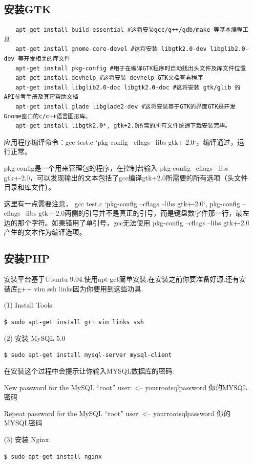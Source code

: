 \subsection{安装GTK}
\begin{verbatim}
　　apt-get install build-essential #这将安装gcc/g++/gdb/make 等基本编程工具
　　apt-get install gnome-core-devel #这将安装 libgtk2.0-dev libglib2.0-dev 等开发相关的库文件
　　apt-get install pkg-config #用于在编译GTK程序时自动找出头文件及库文件位置
　　apt-get install devhelp #这将安装 devhelp GTK文档查看程序
　　apt-get install libglib2.0-doc libgtk2.0-doc #这将安装 gtk/glib 的API参考手册及其它帮助文档
　　apt-get install glade libglade2-dev #这将安装基于GTK的界面GTK是开发Gnome窗口的c/c++语言图形库。
　　apt-get install libgtk2.0*, gtk+2.0所需的所有文件统通下载安装完毕。
\end{verbatim}

应用程序编译命令：gcc test.c `pkg-config --cflags --libs gtk+-2.0`，编译通过，运行正常。

pkg-config是一个用来管理包的程序，在控制台输入 pkg-config --cflags --libs gtk+-2.0，可以发现输出的文本包括了gcc编译gtk+2.0所需要的所有选项（头文件目录和库文件）。

这里有一点需要注意， gcc test.c `pkg-config --cflags --libs gtk+-2.0`, pkg-config --cflags --libs gtk+-2.0两侧的引号并不是真正的引号，而是键盘数字件那一行，最左边的那个字符。如果错用了单引号，gcc无法使用 pkg-config --cflags --libs gtk+-2.0产生的文本作为编译选项。

\subsection{安装PHP}
安装平台基于Ubuntu 9.04.使用apt-get简单安装.在安装之前你要准备好源.还有安装库g++ vim ssh links因为你要用到这些功具.

(1) Install Tools

\verb"$ sudo apt-get install g++ vim links ssh"

(2) 安装 MySQL 5.0

\verb"$ sudo apt-get install mysql-server mysql-client"

在安装这个过程中会提示让你输入MYSQL数据库的密码:

New password for the MySQL “root” user: <– yourrootsqlpassword 你的MYSQL密码

Repeat password for the MySQL “root” user: <– yourrootsqlpassword 你的MYSQL密码

(3) 安装 Nginx

\verb"$ sudo apt-get install nginx"

